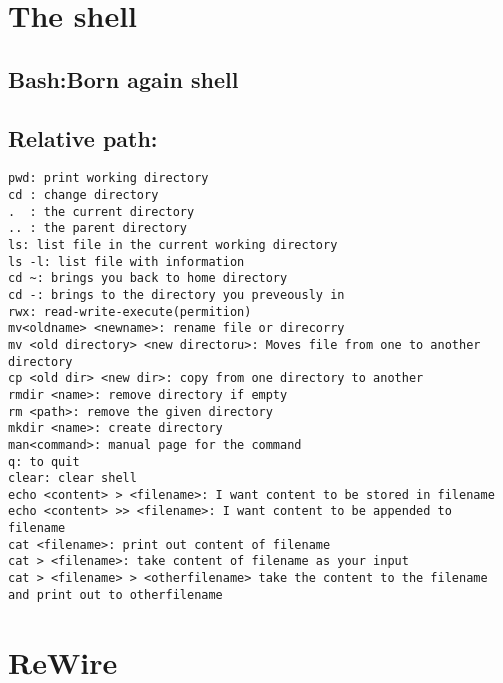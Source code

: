 \documentclass[10pt,a4paper,twoside]{article} %
\begin{document}

\section*{The shell}
\subsection*{Bash:Born again shell}
\subsection*{Relative path:}
\begin{verbatim}
pwd: print working directory
cd : change directory
.  : the current directory
.. : the parent directory
ls: list file in the current working directory
ls -l: list file with information
cd ~: brings you back to home directory
cd -: brings to the directory you preveously in
rwx: read-write-execute(permition)
mv<oldname> <newname>: rename file or direcorry 
mv <old directory> <new directoru>: Moves file from one to another directory
cp <old dir> <new dir>: copy from one directory to another
rmdir <name>: remove directory if empty
rm <path>: remove the given directory
mkdir <name>: create directory
man<command>: manual page for the command
q: to quit
clear: clear shell
echo <content> > <filename>: I want content to be stored in filename
echo <content> >> <filename>: I want content to be appended to filename
cat <filename>: print out content of filename
cat > <filename>: take content of filename as your input 
cat > <filename> > <otherfilename> take the content to the filename and print out to otherfilename

\end{verbatim}

\section*{ReWire}

\begin{verbatim}





\end{verbatim}
\end{document}
